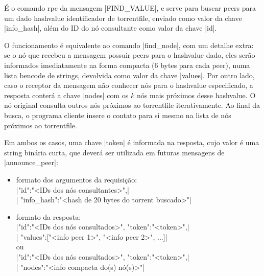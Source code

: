 
\label{subsubsubsec:getpeers}

É o comando \gls*{rpc} da mensagem \bverb|FIND_VALUE|, e serve para buscar \glspl*{peer}
para um dado \gls*{hashvalue} identificador de \gls*{torrentfile}, enviado como valor
da chave \bverb|info_hash|, além do ID do nó consultante como valor da chave \bverb|id|.

O funcionamento é equivalente ao comando \bverb|find_node|, com um detalhe extra: se o
nó que recebeu a mensagem possuir \glspl*{peer} para o \gls*{hashvalue} dado, eles serão
informados imediatamente na forma compacta (6 bytes para cada \gls*{peer}), numa lista
\gls*{bencode} de \glspl*{string}, devolvida como valor da chave \bverb|values|. Por
outro lado, caso o receptor da mensagem não conhecer nós para o \gls*{hashvalue}
especificado, a resposta conterá a chave \bverb|nodes| com os $k$ nós mais próximos
desse \gls*{hashvalue}. O nó original consulta outros nós próximos ao \gls*{torrentfile}
iterativamente. Ao final da busca, o programa cliente insere o contato para si mesmo na
lista de nós próximos ao \gls*{torrentfile}.

Em ambos os casos, uma chave \bverb|token| é informada na resposta, cujo valor é uma
\gls*{string} binária curta, que deverá ser utilizada em futuras mensagens de
\bverb|announce_peer|:

\begin{itemize}
    \item formato dos argumentos da requisição: \\
        \sverb|{"id":"<IDs dos nós consultantes>",| \\
        \sverb| "info_hash":"<hash de 20 bytes do torrent buscado>"}|

    \item formato da resposta: \\
        \sverb|{"id":"<IDs dos nós consultados>", "token":"<token>",| \\
        \sverb| "values":["<info peer 1>", "<info peer 2>", ...]}| \\
        ou \\
        \sverb|{"id":"<IDs dos nós consultados>", "token":"<token>",| \\
        \sverb| "nodes":"<info compacta do(s) nó(s)>"}| \\
\end{itemize}


